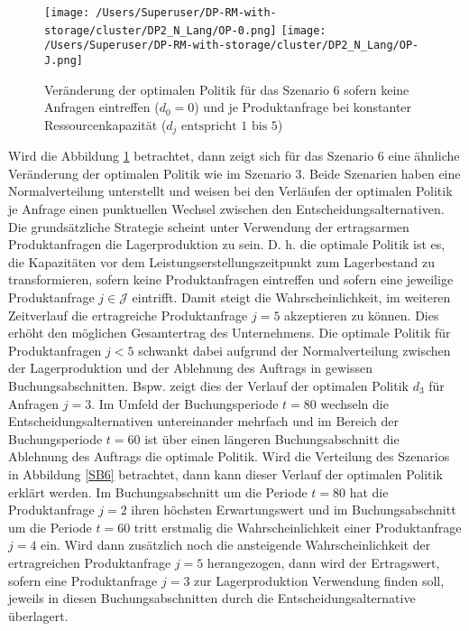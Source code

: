 \begin{figure}[h!]     
\begin{center}
\texttt{[image: /Users/Superuser/DP-RM-with-storage/cluster/DP2\_N\_Lang/OP-0.png]}
\texttt{[image: /Users/Superuser/DP-RM-with-storage/cluster/DP2\_N\_Lang/OP-J.png]}
    \caption{Veränderung der optimalen Politik für das Szenario 6 sofern keine Anfragen eintreffen ($d_0=0$) und je Produktanfrage bei konstanter Ressourcenkapazität ($d_j\text{ entspricht }1\text{ bis }5$)}  \label{SV6}
  \end{center}
\end{figure}

Wird die Abbildung \ref{SV6} betrachtet, dann zeigt sich für das Szenario 6 eine ähnliche Veränderung der optimalen Politik wie im Szenario 3. Beide Szenarien haben eine Normalverteilung unterstellt und weisen bei den Verläufen der optimalen Politik je Anfrage einen punktuellen Wechsel zwischen den Entscheidungsalternativen. Die grundsätzliche Strategie scheint unter Verwendung der ertragsarmen Produktanfragen die \glqq Lagerproduktion{\grqq} zu sein. D. h. die optimale Politik ist es, die Kapazitäten vor dem Leistungserstellungszeitpunkt zum Lagerbestand zu transformieren, sofern keine Produktanfragen eintreffen und sofern eine jeweilige Produktanfrage $j\in\mathcal{J}$ eintrifft. Damit steigt die Wahrscheinlichkeit, im weiteren Zeitverlauf die ertragreiche Produktanfrage $j=5$ akzeptieren zu können. Dies erhöht den möglichen Gesamtertrag des Unternehmens. Die optimale Politik für Produktanfragen $j<5$ schwankt dabei aufgrund der Normalverteilung zwischen der \glqq Lagerproduktion{\grqq} und der \glqq Ablehnung des Auftrags{\grqq} in gewissen Buchungsabschnitten. Bspw. zeigt dies der Verlauf der optimalen Politik $d_3$ für Anfragen $j=3$. Im Umfeld der Buchungsperiode $t=80$ wechseln die Entscheidungsalternativen untereinander mehrfach und im Bereich der Buchungsperiode $t=60$ ist über einen längeren Buchungsabschnitt die \glqq Ablehnung des Auftrags{\grqq} die optimale Politik. Wird die Verteilung des Szenarios in Abbildung \ref{SB6} betrachtet, dann kann dieser Verlauf der optimalen Politik erklärt werden. Im Buchungsabschnitt um die Periode $t=80$ hat die Produktanfrage $j=2$ ihren höchsten Erwartungswert und im Buchungsabschnitt um die Periode $t=60$ tritt erstmalig die Wahrscheinlichkeit einer Produktanfrage $j=4$ ein. Wird dann zusätzlich noch die ansteigende Wahrscheinlichkeit der ertragreichen Produktanfrage $j=5$ herangezogen, dann wird der Ertragswert, sofern eine Produktanfrage $j=3$ zur Lagerproduktion Verwendung finden soll, jeweils in diesen Buchungsabschnitten durch die Entscheidungsalternative überlagert.\\[.5cm]

